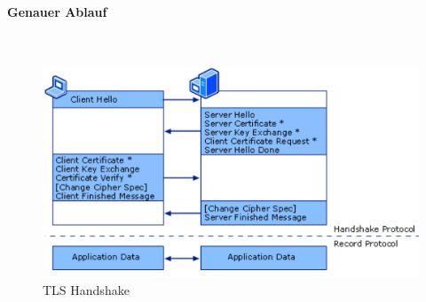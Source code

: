 \paragraph{Genauer Ablauf} \hfill \\
\begin{figure}[h]
	\centering
	\includegraphics[width=0.7\linewidth]{images/tls_handshake}
	\caption{TLS Handshake}
\end{figure}
